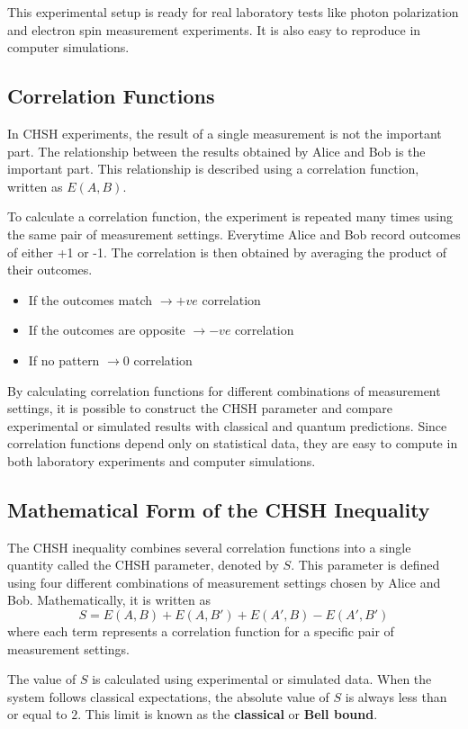 \documentclass[14pt,a4paper]{extarticle}
\begin{document}
This experimental setup is ready for real laboratory tests like photon polarization and electron spin measurement experiments. It is also easy to reproduce in computer simulations.

\subsection{Correlation Functions}
In CHSH experiments, the result of a single measurement is not the important part. The relationship between the results obtained by Alice and Bob is the important part. This relationship is described using a correlation function, written as $E(A,B)$.

To calculate a correlation function, the experiment is repeated many times using the same pair of measurement settings. Everytime Alice and Bob record outcomes of either +1 or -1. The correlation is then obtained by averaging the product of their outcomes.
\begin{itemize}
    \item If the outcomes match $\rightarrow +ve$ correlation
    \item If the outcomes are opposite $\rightarrow -ve$ correlation
    \item If no pattern $\rightarrow 0$ correlation
\end{itemize}
By calculating correlation functions for different combinations of measurement settings, it is possible to construct the CHSH parameter and compare experimental or simulated results with classical and quantum predictions. Since correlation functions depend only on statistical data, they are easy to compute in both laboratory experiments and computer simulations.

\subsection{Mathematical Form of the CHSH Inequality}
The CHSH inequality combines several correlation functions into a single quantity called the CHSH parameter, denoted by $S$. This parameter is defined using four different combinations of measurement settings chosen by Alice and Bob. Mathematically, it is written as
\begin{equation*}
S=E(A,B)+E(A,B')+E(A',B)-E(A',B')
\end{equation*}
where each term represents a correlation function for a specific pair of measurement settings.

The value of $S$ is calculated using experimental or simulated data. When the system follows classical expectations, the absolute value of $S$ is always less than or equal to $2$. This limit is known as the \textbf{classical} or \textbf{Bell bound}.
\end{document}
